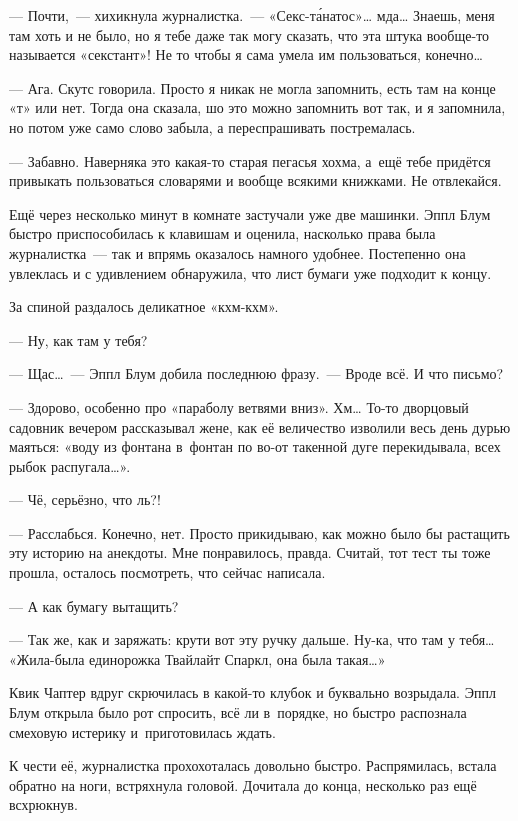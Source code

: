 \documentclass[fontsize=11pt,a5paper,titlepage=firstcover]{scrbook}
\begin{document}
--- Почти,~--- хихикнула журналистка.~--- «Секс-та́натос»{\ldots} мда{\ldots} Знаешь, меня там хоть и не было, но я тебе даже так могу сказать, что эта штука вообще-то называется «секстант»! Не то чтобы я сама умела им пользоваться, конечно{\ldots}

--- Ага. Скутс говорила. Просто я никак не могла запомнить, есть там на конце «т» или нет. Тогда она сказала, шо это можно запомнить вот так, и я запомнила, но потом уже само слово забыла, а переспрашивать постремалась.

--- Забавно. Наверняка это какая-то старая пегасья хохма, а~ещё тебе придётся привыкать пользоваться словарями и вообще всякими книжками. Не отвлекайся.

Ещё через несколько минут в комнате застучали уже две машинки. Эппл Блум быстро приспособилась к клавишам и оценила, насколько права была журналистка~--- так и впрямь оказалось намного удобнее. Постепенно она увлеклась и с удивлением обнаружила, что лист бумаги уже подходит к концу.

За спиной раздалось деликатное «кхм-кхм».

--- Ну, как там у тебя?

--- Щас{\ldots}~--- Эппл Блум добила последнюю фразу.~--- Вроде всё. И что письмо?

--- Здорово, особенно про «параболу ветвями вниз». Хм{\ldots} То-то дворцовый садовник вечером рассказывал жене, как её величество изволили весь день дурью маяться: «воду из фонтана в~фонтан по во-от такенной дуге перекидывала, всех рыбок распугала{\ldots}».

--- Чё, серьёзно, что ль?!

--- Расслабься. Конечно, нет. Просто прикидываю, как можно было бы растащить эту историю на анекдоты. Мне понравилось, правда. Считай, тот тест ты тоже прошла, осталось посмотреть, что сейчас написала.

--- А как бумагу вытащить?

--- Так же, как и заряжать: крути вот эту ручку дальше. Ну-ка, что там у тебя{\ldots} «Жила-была единорожка Твайлайт Спаркл, она была такая{\ldots}»

Квик Чаптер вдруг скрючилась в какой-то клубок и буквально возрыдала. Эппл Блум открыла было рот спросить, всё ли в~порядке, но быстро распознала смеховую истерику и~приготовилась ждать.

К чести её, журналистка прохохоталась довольно быстро. Распрямилась, встала обратно на ноги, встряхнула головой. Дочитала до конца, несколько раз ещё всхрюкнув.
\end{document}

